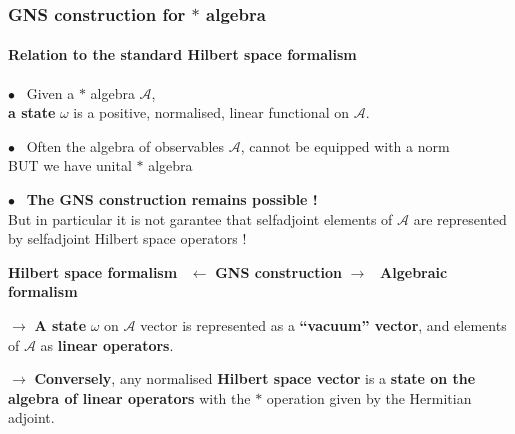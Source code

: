 \documentclass[9pt]{beamer}
\newcommand{\Acal}{\mathcal{A}}
\begin{document}

\begin{frame}

\frametitle{GNS construction for $\ast$ algebra}
\framesubtitle{Relation to the standard Hilbert space formalism}

\vfill

$\bullet$ \ Given a $\ast$ algebra $\Acal$, \\
\hspace*{8pt} \textbf{a state} $\omega$ is a positive, normalised, linear functional on $\Acal$. \\

\vfill
  
$\bullet$ \ Often the algebra of observables $\Acal$, cannot be equipped with a norm \\
\hspace*{8pt} BUT we have unital $\ast$ algebra \\


\vfill

$\bullet$ \ \textbf{The GNS construction remains possible !} \\
\hspace*{8pt} But in particular it is not garantee that selfadjoint elements of $\Acal$ are \hspace*{8pt} represented by selfadjoint Hilbert space operators ! \\
\begin{center}
\textbf{Hilbert space formalism} \ $\leftarrow$ \textbf{GNS construction} $\rightarrow$ \ \textbf{Algebraic formalism}
\end{center}

$\to$ \textbf{A state} $\omega$ on $\Acal$ vector is represented as a \textbf{``vacuum'' vector}, and elements \hspace*{9pt} of $\Acal$ as \textbf{linear operators}. \\

\vfill  

$\to$ \textbf{Conversely}, any normalised \textbf{Hilbert space vector} is a \textbf{state on the algebra \hspace*{9pt} of linear operators} with the $\ast$ operation given by the Hermitian adjoint.
 
\vfill
 
\end{frame}  

\end{document}
